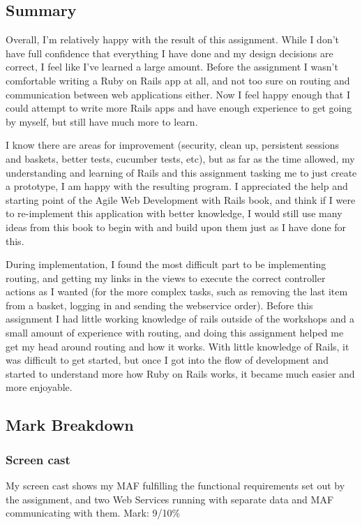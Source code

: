 \documentclass[12pt]{article}
\begin{document}
\subsection{Summary}
Overall, I'm relatively happy with the result of this assignment. While I don't have full confidence that everything I have done and my design decisions are correct, I feel like I've learned a large amount. Before the assignment I wasn't comfortable writing a Ruby on Rails app at all, and not too sure on routing and communication between web applications either. Now I feel happy enough that I could attempt to write more Rails apps and have enough experience to get going by myself, but still have much more to learn.

I know there are areas for improvement (security, clean up, persistent sessions and baskets, better tests, cucumber tests, etc), but as far as the time allowed, my understanding and learning of Rails and this assignment tasking me to just create a prototype, I am happy with the resulting program. I appreciated the help and starting point of the Agile Web Development with Rails\cite{railsbook} book, and think if I were to re-implement this application with better knowledge, I would still use many ideas from this book to begin with and build upon them just as I have done for this.

During implementation, I found the most difficult part to be implementing routing, and getting my links in the views to execute the correct controller actions as I wanted (for the more complex tasks, such as removing the last item from a basket, logging in and sending the webservice order). Before this assignment I had little working knowledge of rails outside of the workshops and a small amount of experience with routing, and doing this assignment helped me get my head around routing and how it works. With little knowledge of Rails, it was difficult to get started, but once I got into the flow of development and started to understand more how Ruby on Rails works, it became much easier and more enjoyable. 

\subsection{Mark Breakdown}
\subsubsection{Screen cast}
My screen cast shows my MAF fulfilling the functional requirements set out by the assignment, and two Web Services running with separate data and MAF communicating with them.
\newline
Mark: 9/10\%
\end{document}
